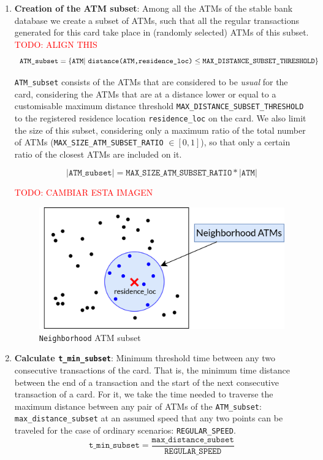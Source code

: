 \documentclass{article}
\begin{document}
\begin{enumerate}
    \item \textbf{Creation of the ATM subset}: Among all the ATMs of the stable bank database we create a subset of ATMs, such that all the regular transactions generated for this card take place in (randomly selected) ATMs of this subset. 
    \textcolor{red}{TODO: ALIGN THIS}
    $$\texttt{ATM\_subset} = \{\texttt{ATM}\ \\
    |\ \texttt{distance(ATM,residence\_loc)} \leq \texttt{MAX\_DISTANCE\_SUBSET\_THRESHOLD}\}$$

    \texttt{ATM\_subset} consists of the ATMs that are considered to be \textit{usual} for the card, considering the ATMs that are at a distance lower or equal to a customisable maximum distance threshold \texttt{MAX\_DISTANCE\_SUBSET\_THRESHOLD} to the registered residence location \texttt{residence\_loc} on the card. We also limit the size of this subset, considering only a maximum ratio of the total number of ATMs (\texttt{MAX\_SIZE\_ATM\_SUBSET\_RATIO} $\in [0,1]$), so that only a certain ratio of the closest ATMs are included on it.

    $$|\texttt{ATM\_subset}| = \texttt{MAX\_SIZE\_ATM\_SUBSET\_RATIO} * |\texttt{ATM}|$$

\textcolor{red}{TODO: CAMBIAR ESTA IMAGEN}
    \begin{figure}[H]
      \centering
      \includegraphics[scale=1.1]{images/tx-generation-1-named.png}
      \caption{\texttt{Neighborhood} ATM subset}
    \end{figure}

    \item \textbf{Calculate \texttt{t\_min\_subset}}: Minimum threshold time between any two consecutive transactions of the card. That is, the minimum time distance between the end of a transaction and the start of the next consecutive transaction of a card. For it, we take the time needed to traverse the maximum distance between any pair of ATMs of the \texttt{ATM\_subset}: \texttt{max\_distance\_subset} at an assumed speed that any two points can be traveled for the case of ordinary scenarios: \texttt{REGULAR\_SPEED}.
    $$\texttt{t\_min\_subset} = \frac{\texttt{max\_distance\_subset}}{\texttt{REGULAR\_SPEED}}$$


\end{enumerate}
\end{document}
